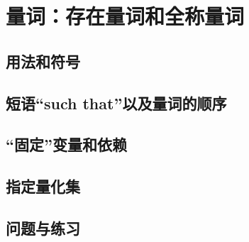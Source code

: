 \section{量词：存在量词和全称量词}

\subsection{用法和符号}

\subsection{短语``such that''以及量词的顺序}

\subsection{``固定''变量和依赖}

\subsection{指定量化集}

\subsection{问题与练习}